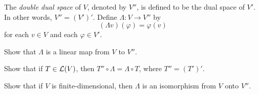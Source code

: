 \begin{exercise}
The \emph{double dual space} of $V$, denoted by $V''$, is defined to be the
dual space of $V'$. In other words, $V''=(V')'$. Define $\Lambda\colon V\to V''$
by
\[ (\Lambda v)(\varphi) = \varphi(v) \]
for each $v\in V$ and each $\varphi\in V'$.
\begin{parts}
\item Show that $\Lambda$ is a linear map from $V$ to $V''$.
\item Show that if $T\in\mathcal{L}(V)$, then $T''\circ\Lambda=\Lambda\circ T$, where
  $T''=(T')'$.
\item Show that if $V$ is finite-dimensional, then $\Lambda$ is an isomorphism
  from $V$ onto $V''$.
\end{parts}
\end{exercise}
